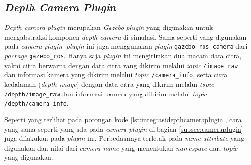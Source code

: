 \subsection{\emph{Depth Camera Plugin}}
\label{subsec:depthcameraplugin}

\emph{Depth camera plugin} merupakan \emph{Gazebo plugin} yang digunakan untuk mengabstraksi komponen \emph{depth camera} di simulasi.
Sama seperti yang digunakan pada \emph{camera plugin},
  \emph{plugin} ini juga menggunakan \emph{plugin} \lstinline{gazebo_ros_camera} dari \emph{package} \lstinline{gazebo_ros}.
Hanya saja \emph{plugin} ini mengirimkan dua macam data citra,
  yakni citra berwarna dengan data citra yang dikirim melalui \emph{topic} \lstinline{/image_raw} dan informasi kamera yang dikirim melalui \emph{topic} \lstinline{/camera_info},
  serta citra kedalaman (\emph{depth image}) dengan data citra yang dikirim melalui \emph{topic} \lstinline{/depth/image_raw} dan informasi kamera yang dikirim melalui \emph{topic} \lstinline{/depth/camera_info}.

Seperti yang terlihat pada potongan kode \ref{lst:integrasidepthcameraplugin},
  cara yang sama seperti yang ada pada \emph{camera plugin} di bagian \ref{subsec:cameraplugin} juga dilakukan pada \emph{plugin} ini.
Perbedaannya terletak pada \emph{name attribute} yang digunakan dan nilai dari \emph{camera name} yang menentukan \emph{namespace} dari \emph{topic} yang digunakan.


